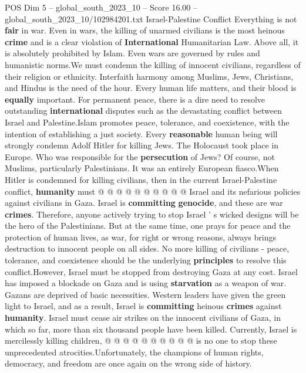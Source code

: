 \begin{textsample}{POS Dim 5 – global\_south\_2023\_10 – Score 16.00 – global\_south\_2023\_10/102984201.txt}  \label{ex:f5_pos_383}
Israel-Palestine Conflict Everything is not \textbf{fair} in war.
Even in wars, the killing of unarmed civilians is the most heinous \textbf{crime} and is a clear violation of \textbf{International} Humanitarian Law.
Above all, it is absolutely prohibited by Islam.
Even wars are governed by rules and humanistic norms.We must condemn the killing of innocent civilians, regardless of their religion or ethnicity.
Interfaith harmony among Muslims, Jews, Christians, and Hindus is the need of the hour.
Every human life matters, and their blood is \textbf{equally} important.
For permanent peace, there is a dire need to resolve outstanding \textbf{international} disputes such as the devastating conflict between Israel and Palestine.Islam promotes peace, tolerance, and coexistence, with the intention of establishing a just society.
Every \textbf{reasonable} human being will strongly condemn Adolf Hitler for killing Jews.
The Holocaust took place in Europe.
Who was responsible for the \textbf{persecution} of Jews?
Of course, not Muslims, particularly Palestinians.
It was an entirely European fiasco.When Hitler is condemned for killing civilians, then in the current Israel-Palestine conflict, \textbf{humanity} must @ @ @ @ @ @ @ @ @ @ Israel and its nefarious policies against civilians in Gaza.
Israel is \textbf{committing} \textbf{genocide}, and these are war \textbf{crimes}.
Therefore, anyone actively trying to stop Israel ' s wicked designs will be the hero of the Palestinians.
But at the same time, one prays for peace and the protection of human lives, as war, for right or wrong reasons, always brings destruction to innocent people on all sides.
No more killing of civilians - peace, tolerance, and coexistence should be the underlying \textbf{principles} to resolve this conflict.However, Israel must be stopped from destroying Gaza at any cost.
Israel has imposed a blockade on Gaza and is using \textbf{starvation} as a weapon of war.
Gazans are deprived of basic necessities.
Western leaders have given the green light to Israel, and as a result, Israel is \textbf{committing} heinous \textbf{crimes} against \textbf{humanity}.
Israel must cease air strikes on the innocent civilians of Gaza, in which so far, more than six thousand people have been killed.
Currently, Israel is mercilessly killing children, @ @ @ @ @ @ @ @ @ @ is no one to stop these unprecedented atrocities.Unfortunately, the champions of human rights, democracy, and freedom are once again on the wrong side of history.

\end{textsample}
